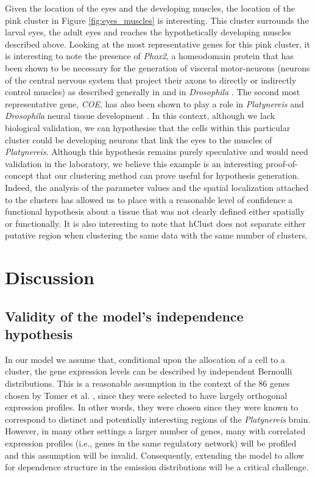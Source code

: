	Given the location of the eyes and the developing muscles, the location of the pink cluster in Figure \ref{fig:eyes_muscles} is interesting. This cluster surrounds the larval eyes, the adult eyes and reaches the hypothetically developing muscles described above. Looking at the most representative genes for this pink cluster, it is interesting to note the presence of {\it{Phox2}}, a homeodomain protein that has been shown to be necessary for the generation of visceral motor-neurons (neurons of the central nervous system that project their axons to directly or indirectly control muscles) as described generally in \cite{brunet02} and in \emph{Drosophila} \cite{briscoe99}. The second most representative gene, {\it{COE}}, has also been shown to play a role in \emph{Platynereis} and \emph{Drosophila} neural tissue development \cite{demilly11}. In this context, although we lack biological validation, we can hypothesise that the cells within this particular cluster could be developing neurons that link the eyes to the muscles of \emph{Platynereis}. Although this hypothesis remains purely speculative and would need validation in the laboratory, we believe this example is an interesting proof-of-concept that our clustering method can prove useful for hypothesis generation. Indeed, the analysis of the parameter values and the spatial localization attached to the clusters has allowed us to place with a reasonable level of confidence a functional hypothesis about a tissue that was not clearly defined either spatially or functionally. It is also interesting to note that hClust does not separate either putative region when clustering the same data with the same number of clusters. \\

	\section{Discussion}
		\subsection{Validity of the model's independence hypothesis}
		In our model we assume that, conditional upon the allocation of a cell to a cluster, the gene expression levels can be described by independent Bernoulli distributions. This is a reasonable assumption in the context of the 86 genes chosen by Tomer et al. \cite{Tomer10}, since they were selected to have largely orthogonal expression profiles. In other words, they were chosen since they were known to correspond to distinct and potentially interesting regions of the {\it{Platynereis}} brain. However, in many other settings a larger number of genes, many with correlated expression profiles (i.e., genes in the same regulatory network) will be profiled and this assumption will be invalid. Consequently, extending the model to allow for dependence structure in the emission distributions will be a critical challenge.
